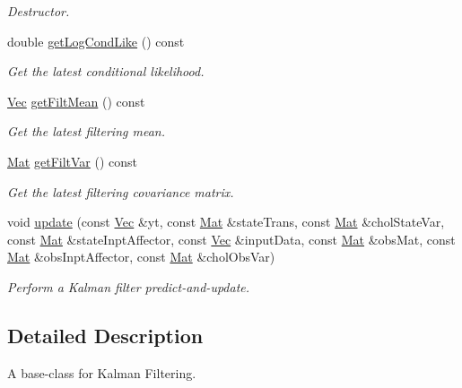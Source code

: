 \begin{DoxyCompactItemize}
\begin{DoxyCompactList}\small\item\em Destructor. \end{DoxyCompactList}\item 
double \hyperlink{classLgssm_abf04a9c7501ab5fa91246963b57721c4}{get\+Log\+Cond\+Like} () const 
\begin{DoxyCompactList}\small\item\em Get the latest conditional likelihood. \end{DoxyCompactList}\item 
\hyperlink{pmfs_8h_a4c7df05c6f5e8a0d15ae14bcdbc07152}{Vec} \hyperlink{classLgssm_aed914f9b681c5788dc11a49f2e31b74f}{get\+Filt\+Mean} () const 
\begin{DoxyCompactList}\small\item\em Get the latest filtering mean. \end{DoxyCompactList}\item 
\hyperlink{pmfs_8h_ae601f56a556993079f730483c574356f}{Mat} \hyperlink{classLgssm_a03c6188372603269f0497a66f41d0563}{get\+Filt\+Var} () const 
\begin{DoxyCompactList}\small\item\em Get the latest filtering covariance matrix. \end{DoxyCompactList}\item 
void \hyperlink{classLgssm_a1f21af488dde504b4c01ccd53ef60e2f}{update} (const \hyperlink{pmfs_8h_a4c7df05c6f5e8a0d15ae14bcdbc07152}{Vec} \&yt, const \hyperlink{pmfs_8h_ae601f56a556993079f730483c574356f}{Mat} \&state\+Trans, const \hyperlink{pmfs_8h_ae601f56a556993079f730483c574356f}{Mat} \&chol\+State\+Var, const \hyperlink{pmfs_8h_ae601f56a556993079f730483c574356f}{Mat} \&state\+Inpt\+Affector, const \hyperlink{pmfs_8h_a4c7df05c6f5e8a0d15ae14bcdbc07152}{Vec} \&input\+Data, const \hyperlink{pmfs_8h_ae601f56a556993079f730483c574356f}{Mat} \&obs\+Mat, const \hyperlink{pmfs_8h_ae601f56a556993079f730483c574356f}{Mat} \&obs\+Inpt\+Affector, const \hyperlink{pmfs_8h_ae601f56a556993079f730483c574356f}{Mat} \&chol\+Obs\+Var)
\begin{DoxyCompactList}\small\item\em Perform a Kalman filter predict-\/and-\/update. \end{DoxyCompactList}\end{DoxyCompactItemize}


\subsection{Detailed Description}
A base-\/class for Kalman Filtering. 

